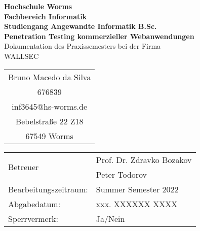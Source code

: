 \begin{titlepage}
    \vspace*{2mm}
    \begin{center}
        \Large
        \textbf{Hochschule Worms}\\
        \textbf{Fachbereich Informatik}\\
        \textbf{Studiengang Angewandte Informatik B.Sc.}\\
        \vspace{1cm}
        \textbf{Penetration Testing kommerzieller Webanwendungen}\\
        \vspace{1cm}
        \large
        Dokumentation des Praxissemesters bei der Firma\\
        \Large{WALLSEC}
        \vspace{2cm}
        \begin {table}[ht]
        \centering
            \begin{tabular}{c}
                Bruno Macedo da Silva  \\ 
                676839                \\
                inf3645@hs-worms.de   \\
                Bebelstraße 22 Z18    \\
                67549 Worms            \\
            \end{tabular}
        \end {table}
        \vspace{2cm}
        \large
        \vspace{1cm}
        \begin{table}[h]
            \centering
            \begin{tabular}{l l}
                \multirow{2}{*}{Betreuer}         & Prof. Dr. Zdravko Bozakov \\
                                                  & Peter Todorov \\
                Bearbeitungszeitraum:    & Summer Semester 2022 \\
                Abgabedatum:          & xxx. XXXXXX XXXX \\
                Sperrvermerk: & Ja/Nein \\
            \end{tabular}
        \end{table}    
    \end{center}
    \normalsize
    \vfill
\end{titlepage}